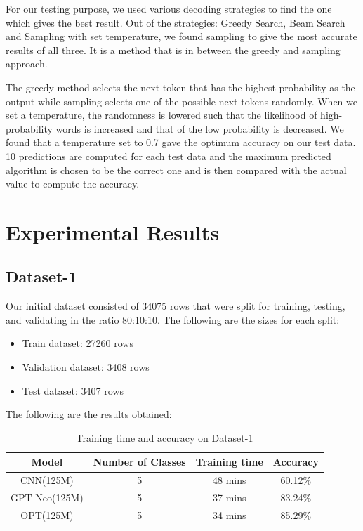 \documentclass[runningheads]{llncs}
\begin{document}
For our testing purpose, we used various decoding strategies to find the one which gives the best result. Out of the strategies: Greedy Search, Beam Search and Sampling with set temperature, we found sampling  to give the most accurate results of all three. It is a method that is in between the greedy and sampling approach. 

The greedy method selects the next token that has the highest probability as the output while sampling selects one of the possible next tokens randomly. When we set a temperature, the randomness is lowered such that the likelihood of high-probability words is increased and that of the low probability is decreased. We found that a temperature set to 0.7 gave the optimum accuracy on our test data. 10 predictions are computed for each test data and the maximum predicted algorithm is chosen to be the correct one and is then compared with the actual value to compute the accuracy.  

\newpage
\section{Experimental Results}

\subsection{Dataset-1}

Our initial dataset consisted of 34075 rows that were split for training, testing, and validating in the ratio 80:10:10. The following are the sizes for each split:

\begin{itemize}
    \item Train dataset: 27260 rows
    \item Validation dataset: 3408 rows
    \item Test dataset: 3407 rows
\end{itemize}  

The following are the results obtained: 

\begin{table}[h!]
    \centering
    \caption{Training time and accuracy on Dataset-1}
    \begin{tabular}{|c|c|c|c|}
    \hline
         \bfseries Model & \bfseries Number of Classes & \bfseries Training time & \bfseries Accuracy \\
    \hline
         CNN(125M) & 5 & 48 mins & 60.12\% \\
    \hline
         GPT-Neo(125M) & 5 & 37 mins & 83.24\% \\
    \hline
         OPT(125M) & 5 & 34 mins & 85.29\% \\
    \hline
    \end{tabular}
    \label{tab:dataset-1}
\end{table}  
\end{document}

